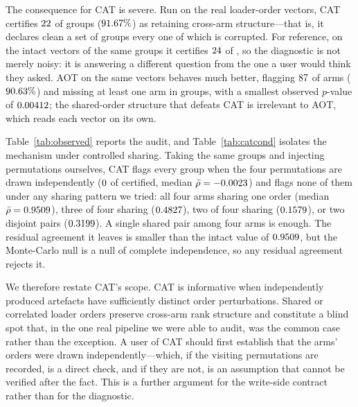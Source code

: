 \documentclass[a4paper,fleqn]{cas-sc}
\newcommand{\fitwidth}[1]{%
  \resizebox{\ifdim\width>\linewidth \linewidth\else \width\fi}{!}{#1}}
\begin{document}
The consequence for CAT is severe. Run on the real loader-order vectors, CAT
certifies $22{}$ of \NumObsPermGroups{} groups
($\NumObsCatCertPct\%$) as retaining cross-arm structure---that is, it declares
clean a set of groups every one of which is corrupted. For reference, on the intact
vectors of the same groups it certifies $24{}$ of
\NumObsPermGroups{}, so the diagnostic is not merely noisy: it is answering a
different question from the one a user would think they asked. AOT on the same
vectors behaves much better, flagging $87{}$ of
\NumObsPermArms{} arms ($90.63\%$) and missing at least one arm in
\NumObsAotMissGroups{} groups, with a smallest observed $p$-value of
$0.00412{}$; the shared-order structure that defeats CAT is irrelevant to
AOT, which reads each vector on its own.

Table~\ref{tab:observed} reports the audit, and Table~\ref{tab:catcond} isolates
the mechanism under controlled sharing. Taking the same \NumCatCondGroups{} groups
and injecting permutations ourselves, CAT flags every group when the four
permutations are drawn independently ($0{}$ of
\NumCatCondGroups{} certified, median
$\bar{\rho} = -0.0023{}$) and flags none of them under any
sharing pattern we tried: all four arms sharing one order
(median $\bar{\rho} = 0.9509{}$), three of four sharing
($0.4827{}$), two of four sharing
($0.1579{}$), or two disjoint pairs
($0.3199{}$). A single shared pair among four arms is enough. The
residual agreement it leaves is smaller than the intact value of
$0.9509{}$, but the Monte-Carlo null is a null of complete
independence, so any residual agreement rejects it.

We therefore restate CAT's scope. CAT is informative when independently produced
artefacts have sufficiently distinct order perturbations. Shared or correlated
loader orders preserve cross-arm rank structure and constitute a blind spot that,
in the one real pipeline we were able to audit, was the common case rather than the
exception. A user of CAT should first establish that the arms' orders were drawn
independently---which, if the visiting permutations are recorded, is a direct
check, and if they are not, is an assumption that cannot be verified after the
fact. This is a further argument for the write-side contract rather than for the
diagnostic.

\begin{table}[t]
\centering
\caption{Audit of the independence assumption behind CAT on
\NumObsPermGroups{} real defective four-arm groups. The stored visiting
permutations are shared across arms far more often than not, and CAT consequently
certifies $\NumObsCatCertPct\%$ of genuinely corrupted groups as clean. Generated
by \texttt{tools/make\_cat\_revision.py}; source
\texttt{artifacts/observed\_perm\_scan.csv}.}
\label{tab:observed}
\fitwidth{}
\end{table}
\end{document}
